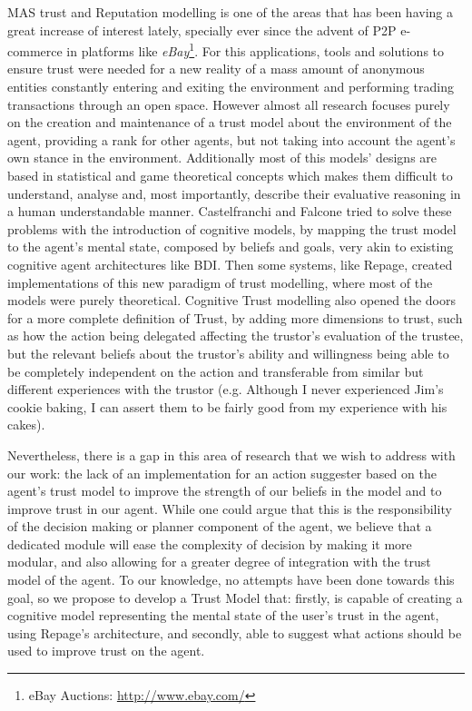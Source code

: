 \ac{MAS} trust and Reputation modelling is one of the areas that has been having a great increase of interest lately, specially ever since the advent of \ac{P2P} e-commerce in platforms like \textit{eBay}\footnote{eBay Auctions: \url{http://www.ebay.com/}}. For this applications, tools and solutions to ensure trust were needed for a new reality of a mass amount of anonymous entities constantly entering and exiting the environment and performing trading transactions through an open space. However almost all research focuses purely on the creation and maintenance of a trust model about the environment of the agent, providing a rank for other agents, but not taking into account the agent's own stance in the environment. Additionally most of this models' designs are based in statistical and game theoretical concepts\cite{Granatyr2015} which makes them difficult to understand, analyse and, most importantly, describe their evaluative reasoning in a human understandable manner.
Castelfranchi and Falcone \cite{Castelfranchi1998} tried to solve these problems with the introduction of cognitive models, by mapping the trust model to the agent's mental state, composed by beliefs and goals, very akin to existing cognitive agent architectures like \ac{BDI}\cite{Rao1995}. Then some systems, like Repage\cite{Sabater2006}, created implementations of this new paradigm of trust modelling, where most of the models were purely theoretical. Cognitive Trust modelling also opened the doors for a more complete definition of Trust, by adding more dimensions to trust, such as how the action being delegated affecting the trustor's evaluation of the trustee, but the relevant beliefs about the trustor's ability and willingness being able to be completely independent on the action and transferable from similar but different experiences with the trustor (e.g. Although I never experienced Jim's cookie baking, I can assert them to be fairly good from my experience with his cakes).

Nevertheless, there is a gap in this area of research that we wish to address with our work: the lack of an implementation for an action suggester based on the agent's trust model to improve the strength of our beliefs in the model and to improve trust in our agent. While one could argue that this is the responsibility of the decision making or planner component of the agent, we believe that a dedicated module will ease the complexity of decision by making it more modular, and also allowing for a greater degree of integration with the trust model of the agent. To our knowledge, no attempts have been done towards this goal, so we propose to develop a Trust Model that: firstly, is capable of creating a cognitive model representing the mental state of the user's trust in the agent, using Repage's architecture, and secondly, able to suggest what actions should be used to improve trust on the agent.

